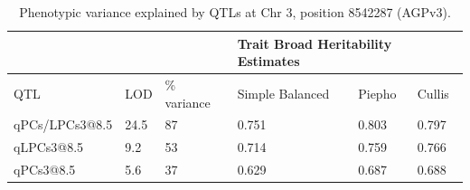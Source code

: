 \documentclass[9pt,twocolumn,twoside,lineno]{BioRxiv}
\begin{document}
\clearpage


\begin{table}[h!]
\begin{tabular}{@{}llllll@{}}
\toprule
               &      &             & \multicolumn{3}{l}{Trait Broad Heritability Estimates} \\ \midrule
QTL            & LOD  & \% variance & Simple Balanced        & Piepho        & Cullis        \\
qPCs/LPCs3@8.5 & 24.5 & 87          & 0.751                  & 0.803         & 0.797           \\
qLPCs3@8.5     & 9.2  & 53          & 0.714                  & 0.759         & 0.766         \\
qPCs3@8.5      & 5.6  & 37          & 0.629                  & 0.687         & 0.688         \\ \bottomrule
\end{tabular}
\label{tab:table2}
\caption{ Phenotypic variance explained by QTLs at Chr 3, position 8542287 (AGPv3).}
\end{table}

\clearpage

\renewcommand{\thefigure}{S\arabic{figure}}
\renewcommand{\thetable}{S\arabic{table}}%

\setcounter{figure}{0}
\setcounter{table}{0}
\end{document}
